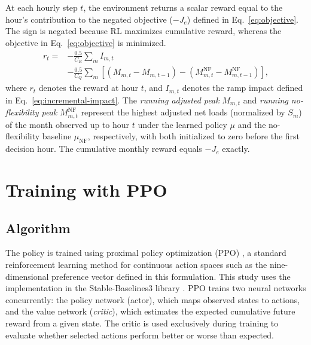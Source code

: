 \documentclass{UNCC-thesis}
\begin{document}
At each hourly step \(t\), the environment returns a scalar reward equal to the hour's
contribution to the negated objective (\(-J_e\)) defined in Eq.~\eqref{eq:objective}. The
sign is negated because RL maximizes cumulative reward, whereas the objective in
Eq.~\eqref{eq:objective} is minimized.
\begin{equation}
  \begin{aligned}
    r_t
    ={}&-\frac{0.5}{C_R}\sum_m I_{m,t}\\
    &-\frac{0.5}{C_Q}\sum_m\left[
      \left(M_{m,t}-M_{m,t-1}\right)
      -\left(M^{\mathrm{NF}}_{m,t}-M^{\mathrm{NF}}_{m,t-1}\right)
    \right],
  \end{aligned}
  \label{eq:reward}
\end{equation}
where \(r_t\) denotes the reward at hour \(t\), and
\(I_{m,t}\) denotes the ramp impact defined in Eq.~\eqref{eq:incremental-impact}. The
\emph{running adjusted peak} \(M_{m,t}\) and \emph{running no-flexibility peak}
\(M^{\mathrm{NF}}_{m,t}\) represent the highest adjusted net loads (normalized by \(S_m\)) of
the month observed up to hour \(t\) under the learned policy \(\mu\) and the no-flexibility
baseline \(\mu_{\mathrm{NF}}\), respectively, with both initialized to zero
before the first decision hour. The cumulative monthly reward equals \(-J_e\) exactly.

\section{Training with PPO}
\label{sec:method-ppo}

\subsection{Algorithm}
\label{subsec:method-algorithm}

The policy is trained using proximal policy optimization (PPO) \cite{schulman2017ppo}, a
standard reinforcement learning method for continuous action spaces such as the
nine-dimensional preference vector defined in this formulation. This study uses the
implementation in the Stable-Baselines3 library
\cite{raffin2021sb3}. PPO trains two neural networks concurrently: the policy network
(actor), which maps observed states to actions, and the value network (\emph{critic}), which
estimates the expected cumulative future reward from a given state. The critic is used
exclusively during training to evaluate whether selected actions perform better or worse
than expected.
\end{document}
